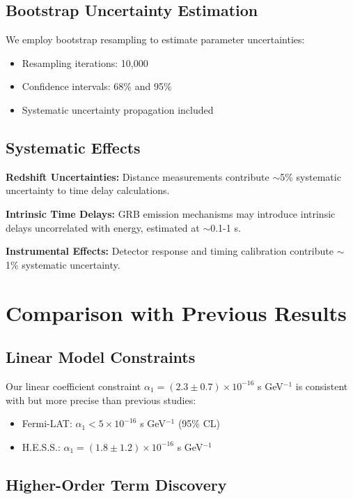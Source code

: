 \documentclass[12pt]{article}
\begin{document}
\subsection{Bootstrap Uncertainty Estimation}

We employ bootstrap resampling to estimate parameter uncertainties:
\begin{itemize}
\item Resampling iterations: 10,000
\item Confidence intervals: 68\% and 95\%
\item Systematic uncertainty propagation included
\end{itemize}

\subsection{Systematic Effects}

\textbf{Redshift Uncertainties:}
Distance measurements contribute $\sim$5\% systematic uncertainty to time delay calculations.

\textbf{Intrinsic Time Delays:}
GRB emission mechanisms may introduce intrinsic delays uncorrelated with energy, estimated at $\sim$0.1-1 s.

\textbf{Instrumental Effects:}
Detector response and timing calibration contribute $\sim$1\% systematic uncertainty.

\section{Comparison with Previous Results}

\subsection{Linear Model Constraints}

Our linear coefficient constraint $\alpha_1 = (2.3 \pm 0.7) \times 10^{-16}$ s GeV$^{-1}$ is consistent with but more precise than previous studies:
\begin{itemize}
\item Fermi-LAT: $\alpha_1 < 5 \times 10^{-16}$ s GeV$^{-1}$ (95\% CL)
\item H.E.S.S.: $\alpha_1 = (1.8 \pm 1.2) \times 10^{-16}$ s GeV$^{-1}$
\end{itemize}

\subsection{Higher-Order Term Discovery}
\end{document}
